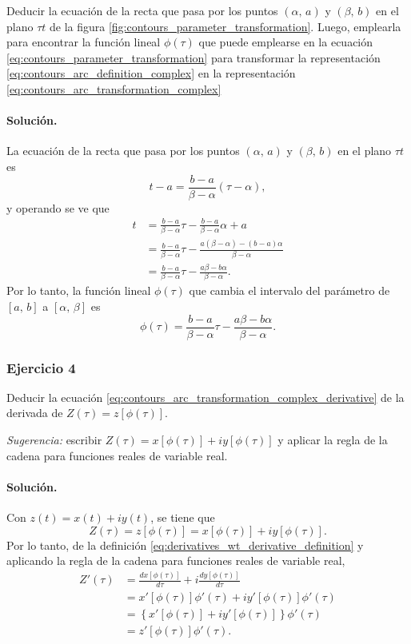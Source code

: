 \documentclass[a4paper]{report}
\begin{document}
Deducir la ecuación de la recta que pasa por los puntos \((\alpha,\,a)\) y \((\beta,\,b)\) en el plano \(\tau t\) de la figura \ref{fig:contours_parameter_transformation}. Luego, emplearla para encontrar la función lineal \(\phi(\tau)\) que puede emplearse en la ecuación \ref{eq:contours_parameter_transformation} para transformar la representación \ref{eq:contours_arc_definition_complex} en la representación \ref{eq:contours_arc_transformation_complex}

\paragraph{Solución.} La ecuación de la recta que pasa por los puntos \((\alpha,\,a)\) y \((\beta,\,b)\) en el plano \(\tau t\) es
\[
 t-a=\frac{b-a}{\beta-\alpha}(\tau-\alpha),
\]
y operando se ve que
\begin{align*}
 t&=\frac{b-a}{\beta-\alpha}\tau-\frac{b-a}{\beta-\alpha}\alpha+a\\
  &=\frac{b-a}{\beta-\alpha}\tau-\frac{a(\beta-\alpha)-(b-a)\alpha}{\beta-\alpha}\\
  &=\frac{b-a}{\beta-\alpha}\tau-\frac{a\beta-b\alpha}{\beta-\alpha}.
\end{align*}
Por lo tanto, la función lineal \(\phi(\tau)\) que cambia el intervalo del parámetro de \([a,\,b]\) a \([\alpha,\,\beta]\) es
\[
 \phi(\tau)=\frac{b-a}{\beta-\alpha}\tau-\frac{a\beta-b\alpha}{\beta-\alpha}.
\]

\subsubsection{Ejercicio 4}

Deducir la ecuación \ref{eq:contours_arc_transformation_complex_derivative} de la derivada de \(Z(\tau)=z[\phi(\tau)]\).

\emph{Sugerencia:} escribir \(Z(\tau)=x[\phi(\tau)]+iy[\phi(\tau)]\) y aplicar la regla de la cadena para funciones reales de variable real.

\paragraph{Solución.} Con \(z(t)=x(t)+iy(t)\), se tiene que 
\[
 Z(\tau)=z[\phi(\tau)]=x[\phi(\tau)]+iy[\phi(\tau)].
\]
Por lo tanto, de la definición \ref{eq:derivatives_wt_derivative_definition} y aplicando la regla de la cadena para funciones reales de variable real,
\begin{align*}
 Z'(\tau)&=\frac{dx[\phi(\tau)]}{d\tau}+i\frac{dy[\phi(\tau)]}{d\tau}\\
 &=x'[\phi(\tau)]\phi'(\tau)+iy'[\phi(\tau)]\phi'(\tau)\\
 &=\left\{x'[\phi(\tau)]+iy'[\phi(\tau)]\right\}\phi'(\tau)\\
 &=z'[\phi(\tau)]\phi'(\tau).
\end{align*}
\end{document}
